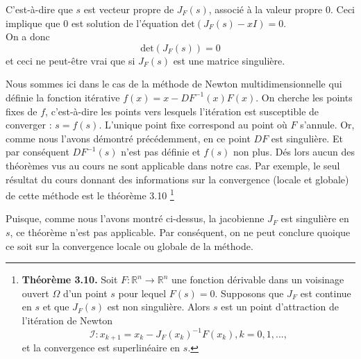 C'est-à-dire que $s$ est vecteur propre de $J_F(s)$, associé à la valeur propre $0$. Ceci implique que $0$ est solution de l'équation $\text{det}(J_F(s)-xI)=0$.\\
On a donc $$\text{det}(J_F(s))=0$$ et ceci ne peut-être vrai que si $J_F(s)$ est une matrice singulière.

Nous sommes ici dans le cas de la méthode de Newton multidimensionnelle qui définie la fonction itérative $f(x)=x-DF^{-1}(x) F(x)$. On cherche les points fixes de $f$, c'est-à-dire les points vers lesquels l'itération est susceptible de converger : $s=f(s)$. L'unique point fixe correspond au point où $F$ s'annule. Or, comme nous l'avons démontré précédemment, en ce point $DF$ est singulière. Et par conséquent $DF^{-1}(s)$ n'est pas définie et $f(s)$ non plus. Dés lors aucun des théorèmes vus au cours ne sont applicable dans notre cas. Par exemple, le seul résultat du cours donnant des informations sur la convergence (locale et globale) de cette méthode est le théorème 3.10 \footnote{
\textbf{Théorème 3.10.} Soit $F : \mathbb{R}^n \rightarrow \mathbb{R}^n$ une fonction dérivable dans un voisinage ouvert $\Omega$ d'un point $s$ pour lequel $F(s)=0$. Supposons que $J_F$ est continue en $s$ et que $J_F(s)$ est non singulière. Alors $s$ est un point d'attraction de l'itération de Newton $$\mathcal{I} : x_{k+1} = x_k - J_F(x_k)^{-1}F(x_k), k = 0,1,...,$$ et la convergence est superlinéaire en $s$.}

Puisque, comme nous l'avons montré ci-dessus, la jacobienne $J_F$ est singulière en $s$, ce théorème n'est pas applicable. Par conséquent, on ne peut conclure quoique ce soit sur la convergence locale ou globale de la méthode.



